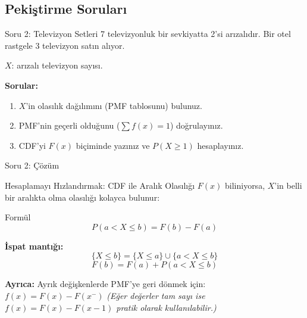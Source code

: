 ﻿\documentclass[light]{lutbeamer}
\begin{document}
\subsection{Pekiştirme Soruları}

\begin{frame}{Soru 2: Televizyon Setleri}
    7 televizyonluk bir sevkiyatta 2'si arızalıdır. Bir otel rastgele 3 televizyon satın alıyor.

    $X$: arızalı televizyon sayısı.

    \textbf{Sorular:}
    \begin{enumerate}
        \item[(a)] $X$'in olasılık dağılımını (PMF tablosunu) bulunuz.
        \item[(b)] PMF'nin geçerli olduğunu ($\sum f(x) = 1$) doğrulayınız.
        \item[(c)] CDF'yi $F(x)$ biçiminde yazınız ve $P(X \ge 1)$ hesaplayınız.
    \end{enumerate}
\end{frame}

\begin{frame}{Soru 2: Çözüm}
\end{frame}



\begin{frame}{Hesaplamayı Hızlandırmak: CDF ile Aralık Olasılığı}
    $F(x)$ biliniyorsa, $X$'in belli bir aralıkta olma olasılığı kolayca bulunur:

    \begin{block}{Formül}
        \[
        P(a < X \le b) = F(b) - F(a)
        \]
    \end{block}

    \textbf{İspat mantığı:}
    \[
    \{X \le b\} = \{X \le a\} \cup \{a < X \le b\}
    \]
    \[
    F(b) = F(a) + P(a < X \le b)
    \]

    \textbf{Ayrıca:} Ayrık değişkenlerde PMF'ye geri dönmek için:
    $f(x) = F(x) - F(x^{-})$
    \scriptsize \textit{(Eğer değerler tam sayı ise $f(x)=F(x)-F(x-1)$ pratik olarak kullanılabilir.)}
\end{frame}
\end{document}
